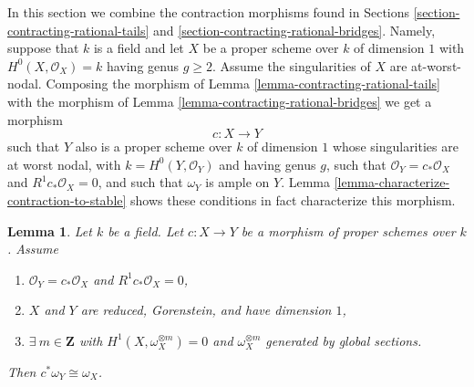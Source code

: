 \documentclass{stacks-project}
\theoremstyle{plain}
\newtheorem{lemma}[subsection]{Lemma}
\theoremstyle{definition}
\theoremstyle{remark}
\numberwithin{equation}{subsection}
\begin{document}
\noindent
In this section we combine the contraction morphisms found in
Sections \ref{section-contracting-rational-tails} and
\ref{section-contracting-rational-bridges}.
Namely, suppose that $k$ is a field and let $X$ be a proper scheme over $k$
of dimension $1$ with $H^0(X, \mathcal{O}_X) = k$ having genus $g \geq 2$.
Assume the singularities of $X$ are at-worst-nodal. Composing
the morphism of Lemma \ref{lemma-contracting-rational-tails}
with the morphism of Lemma \ref{lemma-contracting-rational-bridges}
we get a morphism
$$
c : X \longrightarrow Y
$$
such that $Y$ also is a proper scheme over $k$ of dimension $1$
whose singularities are at worst nodal, with $k = H^0(Y, \mathcal{O}_Y)$
and having genus $g$, such that
$\mathcal{O}_Y = c_*\mathcal{O}_X$ and $R^1c_*\mathcal{O}_X = 0$,
and such that $\omega_Y$ is ample on $Y$.
Lemma \ref{lemma-characterize-contraction-to-stable}
shows these conditions in fact characterize
this morphism.

\begin{lemma}
\label{lemma-contract-gorenstein-canonical}
Let $k$ be a field. Let $c : X \to Y$ be a morphism of proper schemes over $k$.
Assume
\begin{enumerate}
\item $\mathcal{O}_Y = c_*\mathcal{O}_X$ and $R^1c_*\mathcal{O}_X = 0$,
\item $X$ and $Y$ are reduced, Gorenstein, and have dimension $1$,
\item $\exists\ m \in \mathbf{Z}$ with
$H^1(X, \omega_X^{\otimes m}) = 0$ and $\omega_X^{\otimes m}$
generated by global sections.
\end{enumerate}
Then $c^*\omega_Y \cong \omega_X$.
\end{lemma}
\end{document}

